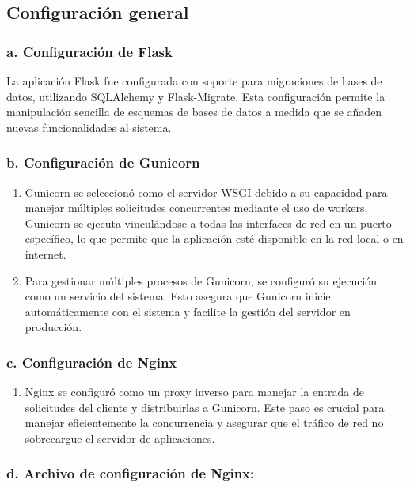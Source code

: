 \subsection*{Configuración general}

\subsubsection*{a. Configuración de Flask}
La aplicación Flask fue configurada con soporte para migraciones de bases de datos, utilizando SQLAlchemy y Flask-Migrate. Esta configuración permite la manipulación sencilla de esquemas de bases de datos a medida que se añaden nuevas funcionalidades al sistema.

\subsubsection*{b. Configuración de Gunicorn}
\begin{enumerate}[label=\roman*.]
    \item Gunicorn se seleccionó como el servidor WSGI debido a su capacidad para manejar múltiples solicitudes concurrentes mediante el uso de workers. Gunicorn se ejecuta vinculándose a todas las interfaces de red en un puerto específico, lo que permite que la aplicación esté disponible en la red local o en internet.
    \item Para gestionar múltiples procesos de Gunicorn, se configuró su ejecución como un servicio del sistema. Esto asegura que Gunicorn inicie automáticamente con el sistema y facilite la gestión del servidor en producción.
\end{enumerate}

\subsubsection*{c. Configuración de Nginx}
\begin{enumerate}[label=\roman*.]
    \item Nginx se configuró como un proxy inverso para manejar la entrada de solicitudes del cliente y distribuirlas a Gunicorn. Este paso es crucial para manejar eficientemente la concurrencia y asegurar que el tráfico de red no sobrecargue el servidor de aplicaciones.
\end{enumerate}

\subsubsection*{d. Archivo de configuración de Nginx:}

